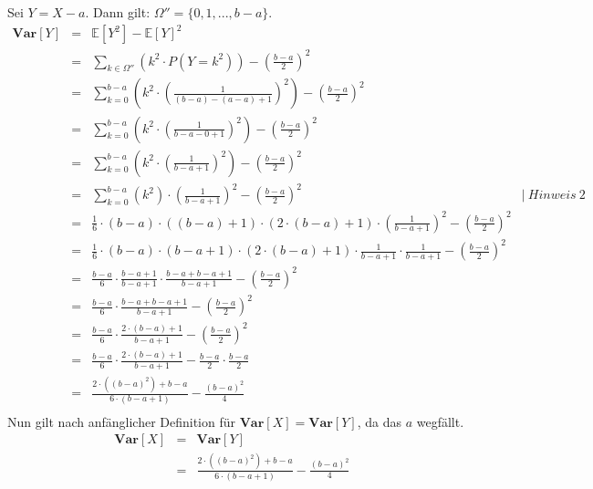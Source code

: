 \documentclass[twoside]{article}
\begin{document}
Sei $Y = X - a$.
Dann gilt: $\Omega'' = \{0, 1, ..., b-a\}$.
\begin{equation*}
    \begin{array}{rlll}
        \textbf{Var}[Y]&=    &\mathbb{E}[Y^2] - \mathbb{E}[Y]^2&\\
            &=    &\sum_{k \in \Omega''}(k^2 \cdot P(Y = k^2)) - (\frac{b - a}{2})^2&\\
            &=    &\sum_{k = 0}^{b-a}(k^2 \cdot (\frac{1}{(b-a)-(a-a)+1})^2) - (\frac{b - a}{2})^2&\\
            &=    &\sum_{k = 0}^{b-a}(k^2 \cdot (\frac{1}{b-a-0+1})^2) - (\frac{b - a}{2})^2&\\
            &=    &\sum_{k = 0}^{b-a}(k^2 \cdot (\frac{1}{b-a+1})^2) - (\frac{b - a}{2})^2&\\
            &=    &\sum_{k = 0}^{b-a}(k^2) \cdot (\frac{1}{b-a+1})^2 - (\frac{b - a}{2})^2& |~Hinweis~2\\
            &=    &\frac{1}{6}\cdot (b - a)\cdot((b - a) + 1)\cdot(2\cdot (b - a) + 1) \cdot (\frac{1}{b-a+1})^2 - (\frac{b - a}{2})^2&\\
            &=    &\frac{1}{6}\cdot (b - a)\cdot(b - a + 1)\cdot(2\cdot (b - a) + 1) \cdot \frac{1}{b-a+1} \cdot \frac{1}{b-a+1} - (\frac{b - a}{2})^2&\\
            &=    &\frac{b-a}{6} \cdot \frac{b-a+1}{b-a+1} \cdot \frac{b-a+b-a+1}{b-a+1} - (\frac{b - a}{2})^2&\\
            &=    &\frac{b-a}{6} \cdot \frac{b-a+b-a+1}{b-a+1} - (\frac{b - a}{2})^2&\\
            &=    &\frac{b-a}{6} \cdot \frac{2 \cdot (b-a)+1}{b-a+1} - (\frac{b - a}{2})^2&\\
            &=    &\frac{b-a}{6} \cdot \frac{2 \cdot (b-a)+1}{b-a+1} - \frac{b - a}{2} \cdot \frac{b - a}{2}&\\
            &=    &\frac{2 \cdot ((b-a)^2)+b-a}{6\cdot(b - a + 1)} - \frac{(b-a)^2}{4}&\\
    \end{array}
\end{equation*}
Nun gilt nach anfänglicher Definition für $\textbf{Var}[X] =\textbf{Var}[Y]$, da das $a$ wegfällt.
\begin{equation*}
    \begin{array}{rlll}
        \textbf{Var}[X]&=    &\textbf{Var}[Y]&\\
            &=    &\frac{2 \cdot ((b-a)^2)+b-a}{6\cdot(b - a + 1)} - \frac{(b-a)^2}{4}&\\
    \end{array}
\end{equation*}
\end{document}
